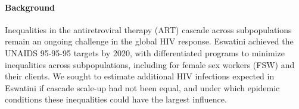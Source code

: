 \paragraph{Background}
Inequalities in the antiretroviral therapy (ART) cascade across subpopulations
remain an ongoing challenge in the global HIV response.
Eswatini achieved the UNAIDS 95-95-95 targets by 2020,
with differentiated programs to minimize inequalities across subpopulations,
including for female sex workers (FSW) and their clients.
We sought to estimate additional HIV infections expected in Eswatini
if cascade scale-up had not been equal,
and under which epidemic conditions these inequalities could have the largest influence.
